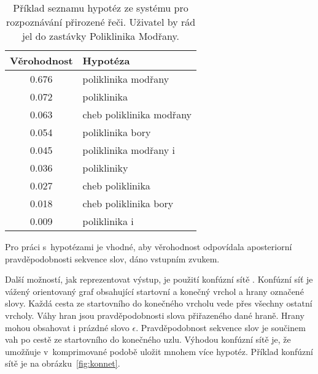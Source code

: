 \begin{table}[h]
\begin{center}
\begin{tabular}{|c|l|}
\hline
Věrohodnost & Hypotéza \\
\hline
\hline
0.676 & poliklinika modřany\\
\hline
0.072 & poliklinika\\
\hline
0.063 & cheb poliklinika modřany\\
\hline
0.054 & poliklinika bory\\
\hline
0.045 & poliklinika modřany i\\
\hline
0.036 & polikliniky\\
\hline
0.027 & cheb poliklinika\\
\hline
0.018 & cheb poliklinika bory\\
\hline
0.009 & poliklinika i\\
\hline
\end{tabular}
\end{center}
\caption{Příklad seznamu hypotéz ze systému pro rozpoznávání přirozené řeči.
Uživatel by rád jel do zastávky Poliklinika Modřany.}
\label{tab:sezhyp}
\end{table}

Pro práci s~hypotézami je vhodné, aby věrohodnost odpovídala aposteriorní pravděpodobnosti sekvence slov, dáno vstupním zvukem.

Další možností, jak reprezentovat výstup, je použití konfúzní sítě \cite{bertoldi2005new}.
Konfúzní síť je vážený orientovaný graf obsahující startovní a konečný vrchol a hrany označené slovy.
Každá cesta ze startovního do konečného vrcholu vede přes všechny ostatní vrcholy.
Váhy hran jsou pravděpodobnosti slova přiřazeného dané hraně.
Hrany mohou obsahovat i prázdné slovo $\epsilon$.
Pravděpodobnost sekvence slov je součinem vah po cestě ze startovního do konečného uzlu.
Výhodou konfúzní sítě je, že umožňuje v~komprimované podobě uložit mnohem více hypotéz.
Příklad konfúzní sítě je na obrázku~\ref{fig:konnet}.

